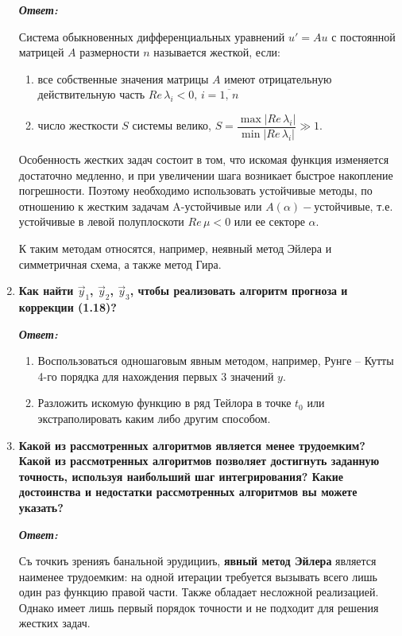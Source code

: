 \documentclass[12pt, a4paper]{article}
\newcommand{\abs}[1]{\lvert #1 \rvert}
\begin{document}
\begin{enumerate}
		\textit{\textbf{Ответ:}}

		Система обыкновенных дифференциальных уравнений $u' = Au$ с постоянной матрицей $A$ размерности $n$ называется жесткой, если: 
		\begin{enumerate}
			\item все собственные значения матрицы $A$ имеют отрицательную действительную часть $Re \, \lambda_i < 0, \, i = \overline{1, \,n}$
			\item число жесткости $S$ системы велико, $S = \dfrac{\max \abs{Re \, \lambda_i}}{\min \abs{Re \, \lambda_i}} \gg 1$.
		\end{enumerate} 

		Особенность жестких задач состоит в том, что искомая функция изменяется достаточно медленно, и при увеличении шага возникает быстрое накопление погрешности. Поэтому необходимо использовать устойчивые методы, по отношению к жестким задачам A-устойчивые или $A(\alpha)-$устойчивые, т.е. устойчивые в левой полуплоскоти $Re \, \mu < 0$ или ее секторе $\alpha$.

		К таким методам относятся, например, неявный метод Эйлера и симметричная схема, а также метод Гира.
		
		\item \textbf{Как найти $\vec{y}_1$, $\vec{y}_2$, $\vec{y}_3$, чтобы реализовать алгоритм прогноза и коррекции (1.18)?}
		\vspace*{0.2cm}
		
		\textit{\textbf{Ответ:}}
		
		\begin{enumerate}
			\item Воспользоваться одношаговым явным методом, например, Рунге -- Кутты 4-го порядка для нахождения первых 3 значений $y$.
			\item Разложить искомую функцию в ряд Тейлора в точке $t_0$ или экстраполировать каким либо другим способом. 
		\end{enumerate}
		
		\item \textbf{ Какой из рассмотренных алгоритмов является менее трудоемким? Какой из рассмотренных алгоритмов позволяет достигнуть заданную точность, используя наибольший шаг интегрирования? Какие достоинства и недостатки рассмотренных алгоритмов вы можете указать?}
		\vspace*{0.2cm}
		
		\textit{\textbf{Ответ:}}

		Съ точкиъ зренияъ банальной эрудицииъ, \textbf{явный метод Эйлера} является наименее трудоемким: на одной итерации требуется вызывать всего лишь один раз функцию правой части. Также обладает несложной реализацией. Однако имеет лишь первый порядок точности и не подходит для решения жестких задач.


\end{enumerate}
\end{document}
